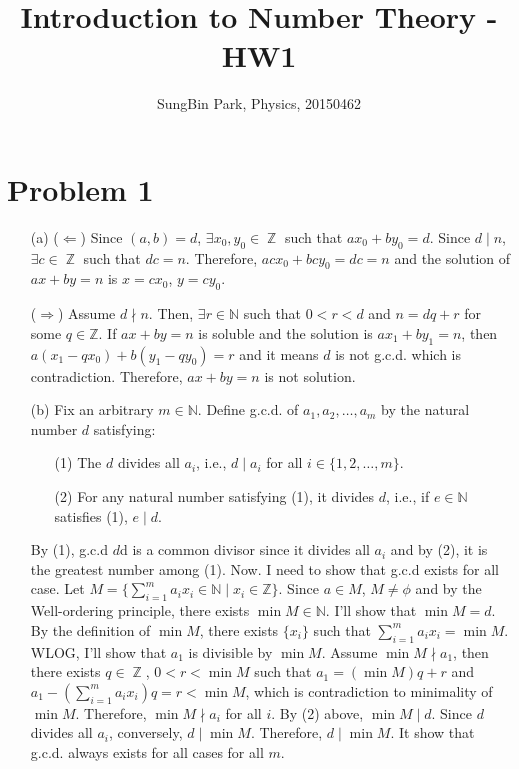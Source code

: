 \documentclass{article}
\DeclareMathOperator{\zz}{\mathbb{Z}}
\begin{document}
\title{Introduction to Number Theory - HW1}
\author{SungBin Park, Physics, 20150462} 

 \maketitle

\section*{Problem 1}
\begin{enumerate}

    \item[(a)] ($\Leftarrow$) Since $(a,b)=d$, $\exists x_0, y_0\in \zz$ such that $ax_0+by_0=d$. Since $d\mid n$, $\exists c\in \zz$ such that $dc=n$. Therefore, $acx_0+bcy_0=dc=n$ and the solution of $ax+by=n$ is $x=cx_0$, $y=cy_0$.
    
    ($\Rightarrow$) Assume $d\nmid n$. Then, $\exists r\in \mathbb{N}$ such that $0<r<d$ and $n=dq+r$ for some $q\in \mathbb{Z}$. If $ax+by=n$ is soluble and the solution is $ax_1+by_1=n$, then $a(x_1-qx_0)+b(y_1-qy_0)=r$ and it means $d$ is not g.c.d. which is contradiction. Therefore, $ax+by=n$ is not solution.

    \item[(b)] Fix an arbitrary $m\in \mathbb{N}$. Define g.c.d. of $a_1, a_2, \ldots, a_m$ by the natural number $d$ satisfying:
    
    \begin{enumerate}
    	\item[(1)] The $d$ divides all $a_i$, i.e., $d \mid a_i$ for all $i\in \{1, 2, \ldots, m\}$.
    	\item[(2)] For any natural number satisfying (1), it divides $d$, i.e., if $e\in \mathbb{N}$ satisfies (1), $e\mid d$.
    \end{enumerate}
    
    By (1), g.c.d $d$d is a common divisor since it divides all $a_i$ and by (2), it is the greatest number among (1). Now. I need to show that g.c.d exists for all case.    
    Let $M=\{\sum\limits_{i=1}^m a_i x_i\in \mathbb{N} \mid x_i\in \mathbb{Z}\}$. Since $a\in M$, $M\neq \phi$ and by the Well-ordering principle, there exists $\min M\in \mathbb{N}$. I'll show that $\min M=d$.
    By the definition of $\min M$, there exists $\{x_i\}$ such that $\sum\limits_{i=1}^m a_i x_i=\min M$. WLOG, I'll show that $a_1$ is divisible by $\min M$. Assume $\min M \nmid a_1$, then there exists $q\in \zz$, $0<r<\min M$ such that $a_1=(\min M)q+r$ and $a_1-(\sum\limits_{i=1}^m a_i x_i)q=r<\min M$, which is contradiction to minimality of $\min M$. Therefore, $\min M \nmid a_i$ for all $i$. By (2) above, $\min M \mid d$.
    Since $d$ divides all $a_i$, conversely, $d\mid \min M$. Therefore, $d\mid \min M$. It show that g.c.d. always exists for all cases for all $m$.
    

\end{enumerate}
\end{document}
